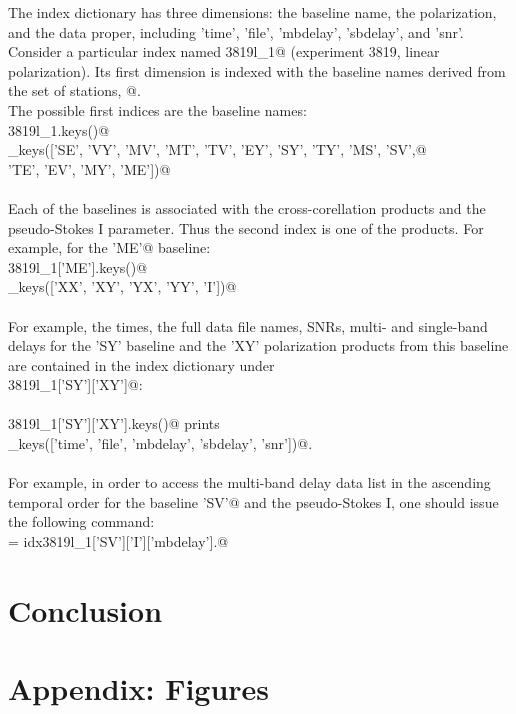 \documentclass[letterpaper,twoside,12pt]{article}
\begin{document}
The index dictionary has three dimensions: the baseline name, the polarization, and the data proper, including 'time', 'file', 'mbdelay', 'sbdelay', and 'snr'. Consider a particular index named \verb@idx3819l_1@ (experiment 3819, linear polarization). Its first dimension is indexed with the baseline names derived from the set of stations, @. \\
\noindent The possible first indices are the baseline names: \\
\verb@idx3819l_1.keys()@ \\
\verb@dict_keys(['SE', 'VY', 'MV', 'MT', 'TV', 'EY', 'SY', 'TY', 'MS', 'SV',@ \\
\verb@           'TE', 'EV', 'MY', 'ME'])@ \\ \\
\noindent Each of the baselines is associated with the cross-corellation products and the pseudo-Stokes I parameter. Thus the second index is one of the products. For example, for the \verb@'ME'@ baseline: \\
\verb@idx3819l_1['ME'].keys()@ \\
\verb@dict_keys(['XX', 'XY', 'YX', 'YY', 'I'])@ \\ \\
For example, the times, the full data file names, SNRs, multi- and single-band delays for the 'SY' baseline and the 'XY' polarization products from this baseline are contained in the index dictionary under \\
\verb@idx3819l_1['SY']['XY']@: \\ \\
\verb@idx3819l_1['SY']['XY'].keys()@ prints \\
\verb@dict_keys(['time', 'file', 'mbdelay', 'sbdelay', 'snr'])@. \\ \\
For example, in order to access the multi-band delay data list in the ascending temporal order for the baseline \verb@'SV'@ and the pseudo-Stokes I, one should issue the following command: \\
\verb@mbd = idx3819l_1['SV']['I']['mbdelay'].@

\section{Conclusion}



\section{Appendix: Figures}
\end{document}

